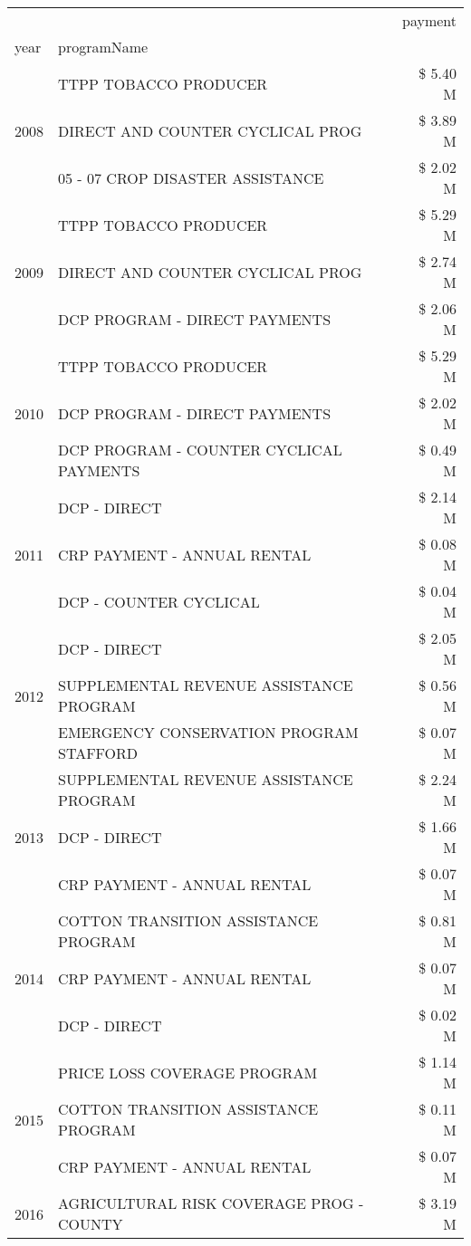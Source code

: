\begin{tabular}{llr}
\toprule
 &  & payment \\
year & programName &  \\
\midrule
\multirow[t]{3}{*}{2008} & TTPP TOBACCO PRODUCER & \$ 5.40 M \\
 & DIRECT AND COUNTER CYCLICAL PROG & \$ 3.89 M \\
 & 05 - 07 CROP DISASTER ASSISTANCE & \$ 2.02 M \\
\cline{1-3}
\multirow[t]{3}{*}{2009} & TTPP TOBACCO PRODUCER & \$ 5.29 M \\
 & DIRECT AND COUNTER CYCLICAL PROG & \$ 2.74 M \\
 & DCP PROGRAM - DIRECT PAYMENTS & \$ 2.06 M \\
\cline{1-3}
\multirow[t]{3}{*}{2010} & TTPP TOBACCO PRODUCER & \$ 5.29 M \\
 & DCP PROGRAM - DIRECT PAYMENTS & \$ 2.02 M \\
 & DCP PROGRAM - COUNTER CYCLICAL PAYMENTS & \$ 0.49 M \\
\cline{1-3}
\multirow[t]{3}{*}{2011} & DCP - DIRECT & \$ 2.14 M \\
 & CRP PAYMENT - ANNUAL RENTAL & \$ 0.08 M \\
 & DCP - COUNTER CYCLICAL & \$ 0.04 M \\
\cline{1-3}
\multirow[t]{3}{*}{2012} & DCP - DIRECT & \$ 2.05 M \\
 & SUPPLEMENTAL REVENUE ASSISTANCE PROGRAM & \$ 0.56 M \\
 & EMERGENCY CONSERVATION PROGRAM STAFFORD & \$ 0.07 M \\
\cline{1-3}
\multirow[t]{3}{*}{2013} & SUPPLEMENTAL REVENUE ASSISTANCE PROGRAM & \$ 2.24 M \\
 & DCP - DIRECT & \$ 1.66 M \\
 & CRP PAYMENT - ANNUAL RENTAL & \$ 0.07 M \\
\cline{1-3}
\multirow[t]{3}{*}{2014} & COTTON TRANSITION ASSISTANCE PROGRAM & \$ 0.81 M \\
 & CRP PAYMENT - ANNUAL RENTAL & \$ 0.07 M \\
 & DCP - DIRECT & \$ 0.02 M \\
\cline{1-3}
\multirow[t]{3}{*}{2015} & PRICE LOSS COVERAGE PROGRAM & \$ 1.14 M \\
 & COTTON TRANSITION ASSISTANCE PROGRAM & \$ 0.11 M \\
 & CRP PAYMENT - ANNUAL RENTAL & \$ 0.07 M \\
\cline{1-3}
\multirow[t]{3}{*}{2016} & AGRICULTURAL RISK COVERAGE PROG - COUNTY & \$ 3.19 M \\

\end{tabular}
